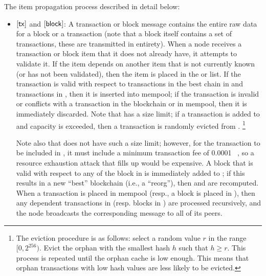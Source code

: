 The item propagation process described in detail below:
\begin{itemize}

\item {}$[\textnormal{\textsf{tx}}]$ and $[\textsf{block}]$: A transaction or block message contains the entire raw data for a block or a transaction (note that a block itself contains a set of transactions, these are transmitted in entirety).
When a node receives a transaction or block item that it does not already have, it attempts to validate it. If the item depends on another item that is not currently known (or has not been validated), then the item is placed in the  or  list.
If the transaction is valid with respect to transactions in the best chain in  and transactions in , then it is inserted into mempool; if the transaction is invalid or conflicts with a transaction in the blockchain or in mempool, then it is immediately discarded.
Note that  has a size limit; if a transaction is added to  and capacity is exceeded, then a transaction is randomly evicted from .
\footnote{The eviction procedure is as follows: select a random value $r$ in the range $[0,2^256)$. Evict the orphan with the smallest hash $h$ such that $h \ge r$. This process is repeated until the orphan cache is low enough. This means that orphan transactions with low hash values are less likely to be evicted.}

Note also that  does not have such a size limit; however, for the transaction to be included in , it must include a minimum transaction fee of 0.0001\btc~ , so a resource exhaustion attack that fills up  would be expensive.
A block that is valid with respect to any of the block in  is immediately added to ; if this results in a new ``best'' blockchain (i.e., a ``reorg''), then  and  are recomputed.
When a transaction is placed in mempool (resp., a block is placed in ), then any dependent transactions in  (resp. blocks in ) are processed recursively, and the node broadcasts the corresponding  message to all of its peers.


\end{itemize}
